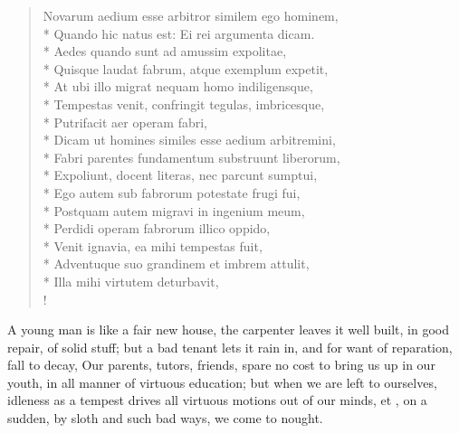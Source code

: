\begin{latin}
\begin{verse}%
Novarum aedium esse arbitror similem ego hominem,\\*
Quando hic natus est: Ei rei argumenta dicam.\\*
Aedes quando sunt ad amussim expolitae,\\*
Quisque laudat fabrum, atque exemplum expetit, \etc{}\\*
At ubi illo migrat nequam homo indiligensque, \etc{}\\*
Tempestas venit, confringit tegulas, imbricesque,\\*
Putrifacit aer operam fabri, \etc{}\\*
Dicam ut homines similes esse aedium arbitremini,\\*
Fabri parentes fundamentum substruunt liberorum,\\*
Expoliunt, docent literas, nec parcunt sumptui,\\*
Ego autem sub fabrorum potestate frugi fui,\\*
Postquam autem migravi in ingenium meum,\\*
Perdidi operam fabrorum illico oppido,\\*
Venit ignavia, ea mihi tempestas fuit,\\*
Adventuque suo grandinem et imbrem attulit,\\*
Illa mihi virtutem deturbavit, \etc{}\\!
\end{verse}%
\end{latin}

A young man is like a fair new house, the carpenter leaves it well built, in
good repair, of solid stuff; but a bad tenant lets it rain in, and for want of
reparation, fall to decay, \etc{} Our parents, tutors, friends, spare no cost
to bring us up in our youth, in all manner of virtuous education; but when we
are left to ourselves, idleness as a tempest drives all virtuous motions out of
our minds, et , on a sudden, by sloth and such bad ways, we
come to nought.


